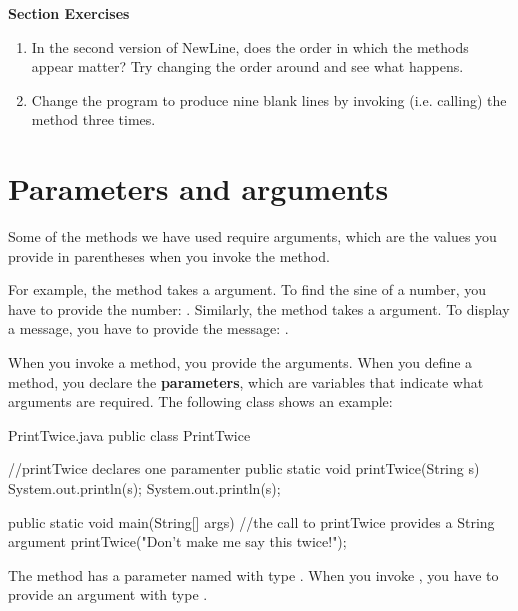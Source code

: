 \textbf{Section Exercises}
\begin{enumerate}
\item In the second version of NewLine, does the order in which the methods appear matter?  Try changing the order around and see what happens.
\item Change the program to produce nine blank lines by invoking (i.e. calling) the method  three times.
\end{enumerate}


\section{Parameters and arguments}

Some of the methods we have used require arguments, which are the values you provide in parentheses when you invoke the method.

For example, the  method takes a  argument.
To find the sine of a number, you have to provide the number: .
Similarly, the  method takes a  argument.
To display a message, you have to provide the message: .


When you invoke a method, you provide the arguments.
When you define a method, you declare the {\bf parameters}, which are variables that indicate what arguments are required.
The following class shows an example:


\begin{trinket}[255]{PrintTwice.java}
public class PrintTwice {

    //printTwice declares one paramenter
    public static void printTwice(String s) {
        System.out.println(s);
        System.out.println(s);
    }

    public static void main(String[] args) {
    	//the call to printTwice provides a String argument
        printTwice("Don't make me say this twice!");
    }
}
\end{trinket}

The  method has a parameter named  with type .
When you invoke , you have to provide an argument with type .


